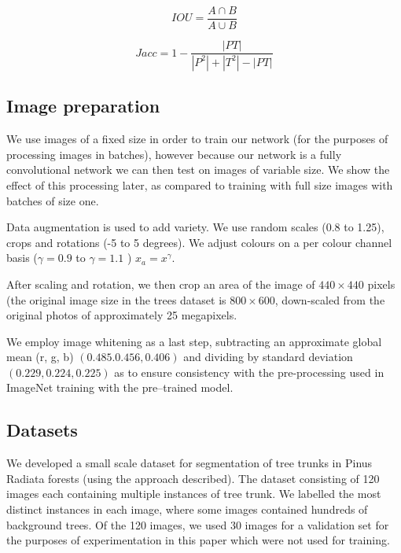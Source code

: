 \begin{equation}
IOU = \frac{A \cap B}{A \cup B}
\label{eq:iou}
\end{equation}


\begin{equation}
Jacc = 1 - \frac{| PT |}{| P^2 | + | T^2 | - | PT |}
\label{eq:jaccard}
\end{equation}



\subsection {Image preparation}

We use images of a fixed size in order to train our network (for the purposes of processing images in batches), however because our network is a fully convolutional network we can then test on images of variable size. We show the effect of this processing later, as compared to training with full size images with batches of size one.

Data augmentation is used to add variety. We use random scales (0.8 to 1.25), crops and rotations (-5 to 5 degrees). We adjust colours on a per colour channel basis ($ \gamma = 0.9 $ to $ \gamma=1.1 $ )  $ x_a = x^{\gamma} $.

After scaling and rotation, we then crop an area of the image of $440 \times 440$ pixels (the original image size in the trees dataset is $800 \times 600$, down-scaled from the original photos of approximately 25 megapixels.

We employ image whitening as a last step, subtracting an approximate global mean (r, g, b) $ (0.485. 0.456, 0.406) $ and dividing by standard deviation $ (0.229, 0.224, 0.225) $ as to ensure consistency with the pre-processing used in ImageNet training with the pre--trained model.



\subsection {Datasets}




We developed a small scale dataset for segmentation of tree trunks in Pinus Radiata forests (using the approach described). The dataset consisting of 120 images each containing multiple instances of tree trunk. We labelled the most distinct instances in each image, where some images contained hundreds of background trees. Of the 120 images, we used 30 images for a validation set for the purposes of experimentation in this paper which were not used for training.

